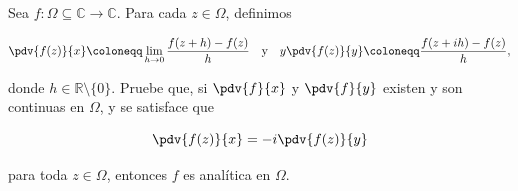 \documentclass[../main.tex]{subfiles}
\begin{document}
\begin{problema}
    Sea \(f \colon \Omega \subseteq \mathbb{C} \to \mathbb{C}\). Para cada \(z\in
    \Omega\), definimos

    \begin{equation*}
        \pdv{f(z)}{x} \coloneqq \lim_{h \to 0} \dfrac{f(z + h) - f(z)}{h}\quad
        \text{y}\quad y \pdv{f(z)}{y} \coloneqq \dfrac{f(z + ih) - f(z)}{h},
    \end{equation*}

    donde \(h\in \mathbb{R}\setminus \{0\}\). Pruebe que, si \(\pdv{f}{x}\)  y \(
    \pdv{f}{y}\) existen y son continuas en \(\Omega\), y se satisface que

    \begin{equation*}
        \pdv{f(z)}{x} = -i \pdv{f(z)}{y}
    \end{equation*}

    para toda \(z\in \Omega\), entonces \(f\) es analítica en \(\Omega\).
\end{problema}
\end{document}
